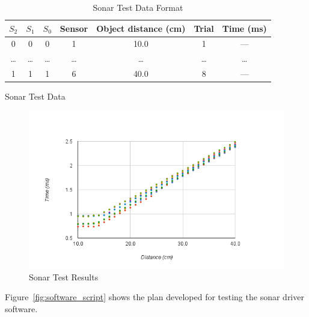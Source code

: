 \documentclass{article}
\begin{document}
    \begin{table}[htb]
        \centering
        \begin{tabular}{|c|c|c|c|c|c|c|}
            \hline
            \textbf{$S_2$}
                & \textbf{$S_1$}
                & \textbf{$S_0$}
                & \textbf{Sensor}
                & \textbf{Object distance (\si{\centi\meter})}
                & \textbf{Trial}
                & \textbf{Time (\si{\milli\second})}
            \\ \hline
            0 & 0 & 0 & 1 & 10.0 & 1 & --- \\ \hline
            \ldots
                & \ldots
                & \ldots
                & \ldots
                & \ldots
                & \ldots
                & \ldots \\ \hline
            1 & 1 & 1 & 6 & 40.0 & 8 & --- \\ \hline
        \end{tabular}
        \caption{Sonar Test Data Format}
        \label{tab:sonar_format}
    \end{table}
    
    \begin{table}[htb]
        \centering
        
        \caption{Sonar Test Data}
        \label{tab:sonar_data}
    \end{table}

    \begin{figure}
        \centering
        \includegraphics[width=\textwidth]{sonargraph.png}
        \caption{Sonar Test Results}
        \label{fig:sonar_results}
    \end{figure}

    Figure~\ref{fig:software_script} shows the plan developed for testing the sonar driver software.
\end{document}
